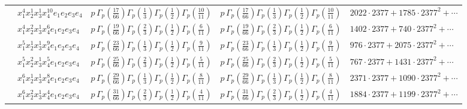 \documentclass[11pt]{article}
\begin{document}
\begin{table}[ht]
{\begin{tabular}{@{}lllll@{}}
 & $x_{1}^{4} x_{2}^{1} x_{3}^{1} x_{4}^{10}  e_{1} e_{2} e_{3} e_{4}$ & $p \, \Gamma_p \left( \frac{17}{66} \right) \Gamma_p \left( \frac{1}{3} \right) \Gamma_p \left( \frac{1}{2} \right) \Gamma_p \left( \frac{10}{11} \right)$ & $p \, \Gamma_p \left( \frac{17}{66} \right) \Gamma_p \left( \frac{1}{3} \right) \Gamma_p \left( \frac{1}{2} \right) \Gamma_p \left( \frac{10}{11} \right)$ & $2022{\cdot}2377{+}1785{\cdot}2377^{2}{+}\cdots$ \\
 & $x_{1}^{4} x_{2}^{2} x_{3}^{1} x_{4}^{6}  e_{1} e_{2} e_{3} e_{4}$ & $p \, \Gamma_p \left( \frac{19}{66} \right) \Gamma_p \left( \frac{2}{3} \right) \Gamma_p \left( \frac{1}{2} \right) \Gamma_p \left( \frac{6}{11} \right)$ & $p \, \Gamma_p \left( \frac{19}{66} \right) \Gamma_p \left( \frac{2}{3} \right) \Gamma_p \left( \frac{1}{2} \right) \Gamma_p \left( \frac{6}{11} \right)$ & $1402{\cdot}2377{+}740{\cdot}2377^{2}{+}\cdots$ \\
 & $x_{1}^{5} x_{2}^{1} x_{3}^{1} x_{4}^{9}  e_{1} e_{2} e_{3} e_{4}$ & $p \, \Gamma_p \left( \frac{23}{66} \right) \Gamma_p \left( \frac{1}{3} \right) \Gamma_p \left( \frac{1}{2} \right) \Gamma_p \left( \frac{9}{11} \right)$ & $p \, \Gamma_p \left( \frac{23}{66} \right) \Gamma_p \left( \frac{1}{3} \right) \Gamma_p \left( \frac{1}{2} \right) \Gamma_p \left( \frac{9}{11} \right)$ & $976{\cdot}2377{+}2075{\cdot}2377^{2}{+}\cdots$ \\
 & $x_{1}^{5} x_{2}^{2} x_{3}^{1} x_{4}^{5}  e_{1} e_{2} e_{3} e_{4}$ & $p \, \Gamma_p \left( \frac{25}{66} \right) \Gamma_p \left( \frac{2}{3} \right) \Gamma_p \left( \frac{1}{2} \right) \Gamma_p \left( \frac{5}{11} \right)$ & $p \, \Gamma_p \left( \frac{25}{66} \right) \Gamma_p \left( \frac{2}{3} \right) \Gamma_p \left( \frac{1}{2} \right) \Gamma_p \left( \frac{5}{11} \right)$ & $767{\cdot}2377{+}1431{\cdot}2377^{2}{+}\cdots$ \\
 & $x_{1}^{6} x_{2}^{1} x_{3}^{1} x_{4}^{8}  e_{1} e_{2} e_{3} e_{4}$ & $p \, \Gamma_p \left( \frac{29}{66} \right) \Gamma_p \left( \frac{1}{3} \right) \Gamma_p \left( \frac{1}{2} \right) \Gamma_p \left( \frac{8}{11} \right)$ & $p \, \Gamma_p \left( \frac{29}{66} \right) \Gamma_p \left( \frac{1}{3} \right) \Gamma_p \left( \frac{1}{2} \right) \Gamma_p \left( \frac{8}{11} \right)$ & $2371{\cdot}2377{+}1090{\cdot}2377^{2}{+}\cdots$ \\
 & $x_{1}^{6} x_{2}^{2} x_{3}^{1} x_{4}^{4}  e_{1} e_{2} e_{3} e_{4}$ & $p \, \Gamma_p \left( \frac{31}{66} \right) \Gamma_p \left( \frac{2}{3} \right) \Gamma_p \left( \frac{1}{2} \right) \Gamma_p \left( \frac{4}{11} \right)$ & $p \, \Gamma_p \left( \frac{31}{66} \right) \Gamma_p \left( \frac{2}{3} \right) \Gamma_p \left( \frac{1}{2} \right) \Gamma_p \left( \frac{4}{11} \right)$ & $1884{\cdot}2377{+}1199{\cdot}2377^{2}{+}\cdots$ \\

\end{tabular}}
\end{table}
\end{document}
